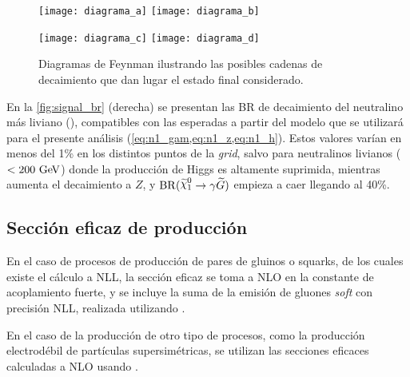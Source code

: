 \begin{figure}[!htb]
  \centering

  \texttt{[image: diagrama\_a]}\hspace{0.5cm}
  \texttt{[image: diagrama\_b]}

  \vspace{1cm}

  \texttt{[image: diagrama\_c]}\hspace{0.5cm}
  \texttt{[image: diagrama\_d]}

  \caption{Diagramas de Feynman ilustrando las posibles cadenas de decaimiento que dan lugar
    el estado final considerado.}
  \label{fig:signal_diagrams}

\end{figure}


En la \cref{fig:signal_br} (derecha) se presentan las BR de decaimiento del neutralino
más liviano (\ninoone), compatibles con las esperadas a partir del modelo que se
utilizará para el presente análisis (\cref{eq:n1_gam,eq:n1_z,eq:n1_h}). Estos
valores varían en menos del 1\% en los distintos puntos de la \emph{grid}, salvo para
neutralinos livianos ($<200\gev$) donde la producción de Higgs es altamente
suprimida, mientras aumenta el decaimiento a $Z$, y $\mathrm{BR}(\ninoone \to
\gam \gravino)$ empieza a caer llegando al 40\%.




\subsection{Sección eficaz de producción}
\label{sec:xs_calc}

En el caso de procesos de producción de pares de gluinos o squarks, de los cuales
existe el cálculo a NLL, la sección eficaz se toma a NLO en la constante de acoplamiento
fuerte, y se incluye la suma de la emisión de gluones \emph{soft} con precisión NLL,
realizada utilizando {\nllfast}\cite{Kramer:2012bx,Beenakker:1996ch,Kulesza:2008jb,Kulesza:2009kq,Beenakker:2009ha,Beenakker:2011fu}.

En el caso de la producción de otro tipo de procesos, como la producción electrodébil de
partículas supersimétricas, se utilizan
las secciones eficaces calculadas a NLO usando {\prospino} \cite{Beenakker:1996ed}.


\newcommand{\pdfcteqpm}{\ensuremath{\mathrm{PDF}^{\pm}_{\mathrm{CTEQ}}}}
\newcommand{\scacteqpm}{\ensuremath{\mu^{\pm}_{\mathrm{CTEQ}}}}

\newcommand{\pdfmstwpm}{\ensuremath{\mathrm{PDF}^{\pm}_{\mathrm{MSTW}}}}
\newcommand{\scamstwpm}{\ensuremath{\mu^{\pm}_{\mathrm{MSTW}}}}

